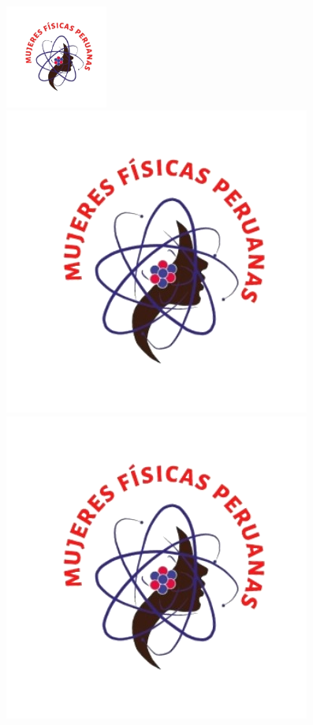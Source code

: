 \documentclass{article}
\begin{document}
\begin{figure}[h]
  \centering
  \includegraphics[width = 0.3\textwidth]{img/logoMFP.png}\\
  \includegraphics[scale = 0.3, angle = 45]{img/logoMFP.png}\\
  \includegraphics[scale = 0.3, angle = -45]{img/logoMFP.png}
\end{figure}
\end{document}
